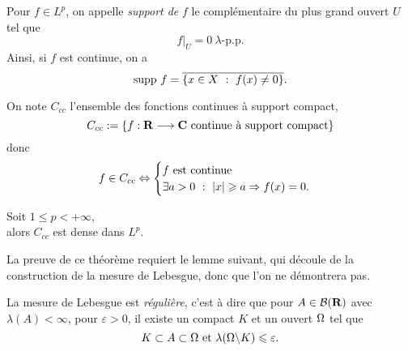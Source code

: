 \documentclass[a4paper,11pt, twoside]{article}
\begin{document}
\begin{Def}
  Pour $f\in L^p$, on appelle \emph{support de }$f$ le complémentaire du plus grand ouvert $U$ tel que 
  $$f\big|_U=0\ \lambda\text{-p.p.}$$
  Ainsi, si $f$ est continue, on a 
  $$\mathrm{supp}\ f=\overline{\ens{x\in X\ :\ f(x)\neq 0}}.$$
\end{Def}


On note $C_{cc}$ l'ensemble des fonctions continues à support compact, 
$$C_{cc}:=\left\{f:\mathbf R\longrightarrow\mathbf C\text{ continue à support compact}\right\}$$
donc 
$$f\in C_{cc}\Leftrightarrow\begin{cases}
  f\text{ est continue }\\
  \exists a>0\ :\ \left| x\right|\geqslant a\Rightarrow f(x)=0.
\end{cases}$$


\begin{Th}
  Soit $1\leqslant p<+\infty$,\\

  alors $C_{cc}$ est dense dans $L^p$.
\end{Th}


La preuve de ce théorème requiert le lemme suivant, qui découle de la construction de la mesure de Lebesgue, donc que l'on ne démontrera pas.


\begin{lemme}
  La mesure de Lebesgue est \emph{régulière}, c'est à dire que pour $A\in\mathcal B(\mathbf R)$ avec $\lambda(A)<\infty$, pour $\varepsilon>0$, il existe un compact $K$ et un ouvert $\Omega$ tel que 
  $$K\subset A\subset \Omega\text{ et }\lambda(\Omega\backslash K)\leqslant \varepsilon.$$
\end{lemme}
\end{document}
